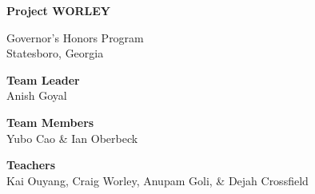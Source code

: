 \documentclass{article}
\renewcommand{\title}{Project WORLEY}
\begin{document}
\begin{titlepage}
  \centering
  \vspace*{1in}
  {\fontsize{56pt}{2\baselineskip}\selectfont \bfseries
  \title}
  \vfill

  \Large
  Governor's Honors Program\\
  Statesboro, Georgia

  \vspace{0.5in}
  \selectfont

  \vspace{1em}
  \textbf{Team Leader}\\ Anish Goyal

  \vspace{1em}
  \textbf{Team Members}\\ Yubo Cao \& Ian Oberbeck

  \vspace{1em}
  \textbf{Teachers}\\ Kai Ouyang, Craig Worley,  Anupam Goli, \& Dejah Crossfield
\end{titlepage}
\tableofcontents
\newpage
\end{document}
